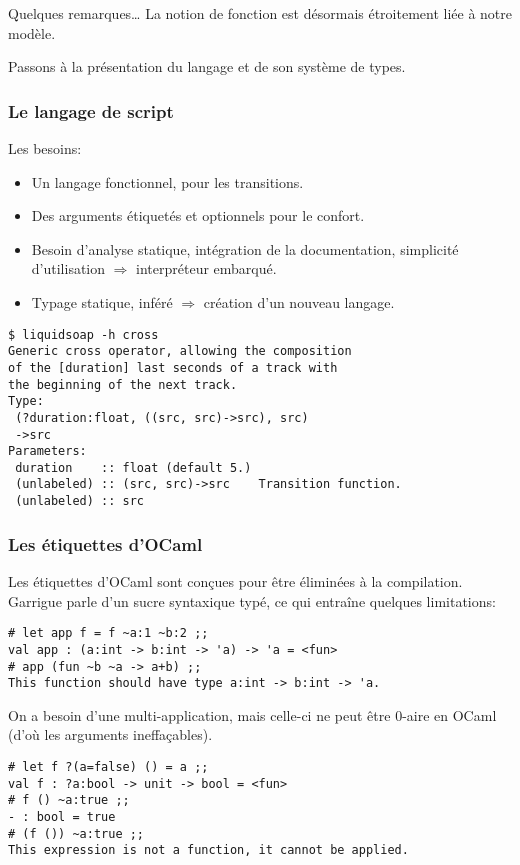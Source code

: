 \documentclass{beamer}
\renewcommand{\emph}[1]{\alert{#1}}
\begin{document}
\begin{ssl}{Quelques remarques\ldots}
La notion de fonction est désormais étroitement liée à notre modèle.

Passons à la présentation du langage et de son système de types.
\end{ssl}


\begin{frame}[fragile]
\frametitle{Le langage de script}

Les besoins:
\begin{itemize}
\item Un langage fonctionnel, pour les transitions.
\item Des arguments étiquetés et optionnels pour le confort.
\item Besoin d'analyse statique, intégration de la documentation, simplicité 
  d'utilisation $\Rightarrow$ interpréteur embarqué.
\item Typage statique, inféré $\Rightarrow$ création d'un nouveau langage.
\end{itemize}

\begin{verbatim}
$ liquidsoap -h cross
Generic cross operator, allowing the composition
of the [duration] last seconds of a track with
the beginning of the next track.
Type:
 (?duration:float, ((src, src)->src), src)
 ->src
Parameters:
 duration    :: float (default 5.)
 (unlabeled) :: (src, src)->src    Transition function.
 (unlabeled) :: src
\end{verbatim}
\end{frame}

\begin{frame}[fragile]\frametitle{Les étiquettes d'OCaml}
Les étiquettes d'OCaml sont conçues pour être 
éliminées à la compilation. Garrigue parle d'un \emph{sucre syntaxique typé},
ce qui entraîne quelques limitations:
{\color{blue}\begin{verbatim}
# let app f = f ~a:1 ~b:2 ;;
val app : (a:int -> b:int -> 'a) -> 'a = <fun>
# app (fun ~b ~a -> a+b) ;;
This function should have type a:int -> b:int -> 'a.
\end{verbatim}}

On a besoin d'une multi-application, mais celle-ci ne peut être 
$0$-aire en OCaml (d'où les arguments ineffaçables).
{\color{blue}\begin{verbatim}
# let f ?(a=false) () = a ;;
val f : ?a:bool -> unit -> bool = <fun>
# f () ~a:true ;;
- : bool = true
# (f ()) ~a:true ;;
This expression is not a function, it cannot be applied.
\end{verbatim}}
\end{frame}
\end{document}
